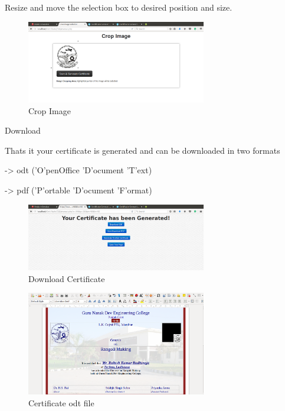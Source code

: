    Resize and move the selection box to desired position and size.

\begin{figure}[!ht]
\centering
\includegraphics[width=0.7\textwidth]{input/images/cgs/cgs5.png}                  
\caption{Crop Image}
\hspace{-1.5em}
\end{figure}

    Download

    Thats it your certificate is generated and can be downloaded in two formats

    -> odt ('O'penOffice 'D'ocument 'T'ext)

    -> pdf ('P'ortable 'D'ocument 'F'ormat)

\begin{figure}[!ht]
\centering
\includegraphics[width=0.7\textwidth]{input/images/cgs/cgs6.png}                  
\caption{Download Certificate}
\hspace{-1.5em}
\end{figure}

\begin{figure}[!ht]
\centering
\includegraphics[width=0.7\textwidth]{input/images/cgs/cgs8.png}                 
\caption{Certificate odt file}
\hspace{-1.5em}
\end{figure}


